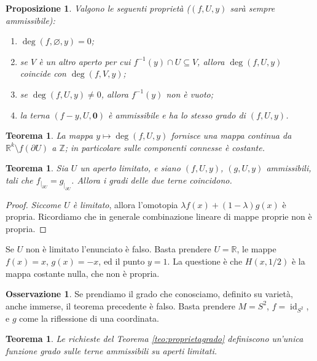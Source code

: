 \documentclass[a4paper, 11pt]{article}
\theoremstyle{definition}
\newtheorem*{Oss}{Osservazione}
\theoremstyle{plain}
\newtheorem{Prop}[Def]{Proposizione}
\newtheorem{Teo}[Def]{Teorema}
\newcommand{\zero}{\mathbf{0}}
\newcommand{\eset}{\varnothing}
\newcommand{\restr}[2]{{#1}_{|_{#2}}}
\newcommand{\R}{\mathbb{R}}
\newcommand{\Z}{\mathbb{Z}}
\DeclareMathOperator{\id}{id}
\begin{document}
\begin{Prop}
	Valgono le seguenti proprietà ($(f,U,y)$ sarà sempre ammissibile):
	\begin{enumerate}
		\item $\deg(f,\eset,y) = 0$;
		\item se $V$ è un altro aperto per cui $f^{-1}(y) \cap U \subseteq V$, allora $\deg(f,U,y)$ coincide con $\deg(f,V,y)$;
		\item se $\deg(f,U,y) \neq 0$, allora $f^{-1}(y)$ non è vuoto;
		\item la terna $(f-y,U, \zero)$ è ammissibile e ha lo stesso grado di $(f,U,y)$.
	\end{enumerate}
\end{Prop}
\begin{Teo}
	La mappa $y \mapsto \deg(f,U,y)$ fornisce una mappa continua da $\R^k \setminus f(\partial U)$ a $\Z$; in particolare sulle componenti connesse è costante.
\end{Teo}
\begin{Teo}
	Sia $U$ un aperto limitato, e siano $(f,U,y)$, $(g,U,y)$ ammissibili, tali che $\restr{f}{\partial U} = \restr{g}{\partial U}$. Allora i gradi delle due terne coincidono.
\end{Teo}
\begin{proof}
	\emph{Siccome $U$ è limitato}, allora l'omotopia $\lambda f(x) + (1-\lambda)g(x)$ è propria. Ricordiamo che in generale combinazione lineare di mappe proprie non è propria.
\end{proof}

Se $U$ non è limitato l'enunciato è falso. Basta prendere $U = \R$, le mappe $f(x) = x$, $g(x) = -x$, ed il punto $y = 1$. La questione è che $H(x, 1/2)$ è la mappa costante nulla, che non è propria.

\begin{Oss}
	Se prendiamo il grado che conosciamo, definito su varietà, anche immerse, il teorema precedente è falso. Basta prendere $M = S^2$, $f = \id_{S^2}$, e $g$ come la riflessione di una coordinata. 
\end{Oss}
\begin{Teo}
	Le richieste del Teorema \ref{teo:proprietagrado} definiscono un'unica funzione grado sulle terne ammissibili su aperti limitati.
\end{Teo}
\end{document}
